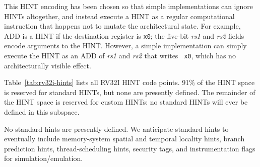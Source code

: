 \begin{commentary}
This HINT encoding has been chosen so that simple implementations can ignore
HINTs altogether, and instead execute a HINT as a regular computational
instruction that happens not to mutate the architectural state.  For example, ADD is
a HINT if the destination register is {\tt x0}; the five-bit {\em rs1} and {\em
rs2} fields encode arguments to the HINT.  However, a simple implementation can
simply execute the HINT as an ADD of {\em rs1} and {\em rs2} that writes {\tt
x0}, which has no architecturally visible effect.
\end{commentary}

Table~\ref{tab:rv32i-hints} lists all RV32I HINT code points.  91\% of the HINT
space is reserved for standard HINTs, but none are presently defined.  The
remainder of the HINT space is reserved for custom HINTs: no standard HINTs
will ever be defined in this subspace.

\begin{commentary}
No standard hints are presently defined.  We anticipate
standard hints to eventually include memory-system spatial and
temporal locality hints, branch prediction hints, thread-scheduling
hints, security tags, and instrumentation flags for
simulation/emulation.
\end{commentary}

